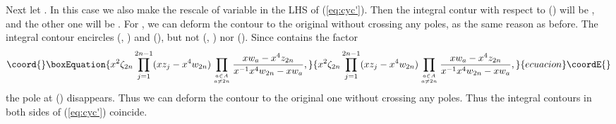 \documentclass[a4paper,10pt]{article}
\begin{document}
Next let \coordHE{}. In this case we also make the rescale 
of variable \coordHE{} in the LHS of 
(\ref{eq:cyc'}). Then the integral 
contur with respect to \coordHE{} (\coordHE{}) 
will be \coordHE{}, 
and the other one will be 
\coordHE{}. 
For \coordHE{}, we can deform the contour 
\coordHE{} to the original \coordHE{} without crossing any poles, 
as the same reason as before. The integral contour 
\coordHE{} encircles \coordHE{} 
(\coordHE{}, 
\coordHE{}) and \coordHE{} 
(\coordHE{}), but not 
\coordHE{} (\coordHE{}, 
\coordHE{}) nor \coordHE{} 
(\coordHE{}). Since 
\coordHE{} 
contains the factor 
\begin{equation}\coord{}\boxEquation{
x^2 \zeta_{2n}\prod_{j=1}^{2n-1} (xz_j -x^4 w_{2n})
\prod_{a\in A\atop a\neq 2n} 
\frac{xw_a -x^4 z_{2n}}{x^{-1}x^4w_{2n}-xw_a}, 
\label{eq:Qtr}
}{
x^2 \zeta_{2n}\prod_{j=1}^{2n-1} (xz_j -x^4 w_{2n})
\prod_{a\in A\atop a\neq 2n} 
\frac{xw_a -x^4 z_{2n}}{x^{-1}x^4w_{2n}-xw_a}, 
}{ecuacion}\coordE{}\end{equation}
the pole at \coordHE{} (\coordHE{}) 
disappears. Thus we can deform the contour 
\coordHE{} to the original one \coordHE{} 
without crossing any poles. Thus the integral contours 
in both sides of (\ref{eq:cyc'}) coincide. 
\end{document}

